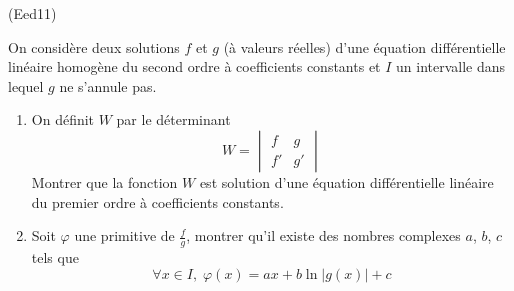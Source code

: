 \begin{tiny}(Eed11)\end{tiny}
On considère deux solutions $f$ et $g$ (à valeurs réelles) d'une équation différentielle linéaire homogène du second ordre à coefficients constants et $I$ un intervalle dans lequel $g$ ne s'annule pas.
\begin{enumerate}
  \item On définit $W$ par le déterminant
\begin{displaymath}
  W = 
\begin{vmatrix}
  f & g \\ f' & g'
\end{vmatrix}
\end{displaymath}
Montrer que la fonction $W$ est solution d'une équation différentielle linéaire du premier ordre à coefficients constants.
\item Soit $\varphi$ une primitive de $\frac{f}{g}$, montrer qu'il existe des nombres complexes $a$, $b$, $c$ tels que
\begin{displaymath}
  \forall x\in I,\; \varphi(x) = ax + b\ln|g(x)| + c
\end{displaymath}

\end{enumerate}
